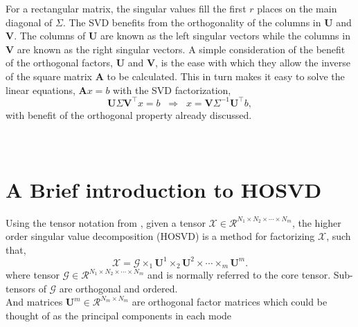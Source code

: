\documentclass[preprint,12pt]{elsarticle}
\begin{document}
\medskip
For a rectangular matrix, the singular values fill the first $r$ places on the main diagonal of $\Sigma$. The SVD benefits from the orthogonality of the columns in $\mathbf{U}$ and $\mathbf{V}$. The columns of $\mathbf{U}$ are known as the left singular vectors while the columns in $\mathbf{V}$ are known as the right singular vectors. A simple consideration of the benefit of the orthogonal factors, $\mathbf{U}$ and $\mathbf{V}$, is the ease with which they allow the inverse of the square matrix $\mathbf{A}$ to be calculated. This in turn makes it easy to solve the linear equations, $\mathbf{A}x = b$ with the SVD factorization,
\begin{equation}\label{e:SVD_factorization}
 \mathbf{U} \Sigma \mathbf{V}^{\intercal} x = b \;\;\Longrightarrow\;\; x = \mathbf{V} \Sigma^{-1} \mathbf{U}^{\intercal} b,
\end{equation} 
with benefit of the orthogonal property already discussed.


\section{\\A Brief introduction to HOSVD}\label{subsection:hosvd_brief}
Using the tensor notation from \citet{Kolda_2009}, given a tensor $\mathscr{X}\in\mathcal{R}^{N_{1}\times N_{2}\times \cdots \times N_{m}}$, the higher order singular value decomposition (HOSVD) is a method for factorizing $\mathscr{X}$, such that,
\begin{equation}
  \mathscr{X} = \mathscr{G} \times_{1} \mathbf{U}^{1}\times_{2} \mathbf{U}^{2}\times \cdots \times_{m} \mathbf{U}^{m}.
\end{equation}
where tensor $\mathscr{G}\in\mathcal{R}^{N_{1}\times N_{2}\times \cdots \times N_{m}}$ and is normally referred to the core tensor. Sub-tensors of $\mathscr{G}$ are orthogonal and ordered.\\
And matrices $\mathbf{U}^{m}\in\mathcal{R}^{N_{m}\times N_{m}}$ are orthogonal factor matrices which could be thought of as the principal components in each mode
\end{document}

